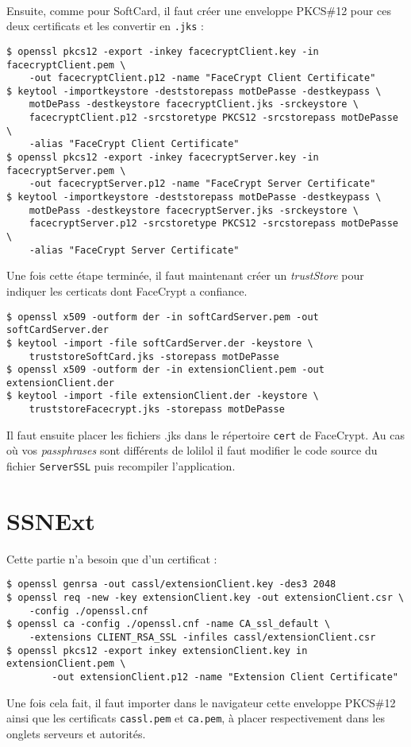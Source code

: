 \documentclass[a4paper,10pt]{article}
\begin{document}
\paragraph{}
Ensuite, comme pour SoftCard, il faut créer une enveloppe PKCS\#12 pour ces
deux certificats et les convertir en \texttt{.jks} : 
\begin{verbatim}
$ openssl pkcs12 -export -inkey facecryptClient.key -in facecryptClient.pem \ 
    -out facecryptClient.p12 -name "FaceCrypt Client Certificate"
$ keytool -importkeystore -deststorepass motDePasse -destkeypass \ 
    motDePass -destkeystore facecryptClient.jks -srckeystore \ 
    facecryptClient.p12 -srcstoretype PKCS12 -srcstorepass motDePasse \ 
    -alias "FaceCrypt Client Certificate"
$ openssl pkcs12 -export -inkey facecryptServer.key -in facecryptServer.pem \ 
    -out facecryptServer.p12 -name "FaceCrypt Server Certificate"
$ keytool -importkeystore -deststorepass motDePasse -destkeypass \ 
    motDePass -destkeystore facecryptServer.jks -srckeystore \ 
    facecryptServer.p12 -srcstoretype PKCS12 -srcstorepass motDePasse \ 
    -alias "FaceCrypt Server Certificate"
\end{verbatim}
Une fois cette étape terminée, il faut maintenant créer un \emph{trustStore}
pour indiquer les certicats dont FaceCrypt a confiance.
\begin{verbatim}
$ openssl x509 -outform der -in softCardServer.pem -out softCardServer.der
$ keytool -import -file softCardServer.der -keystore \ 
    truststoreSoftCard.jks -storepass motDePasse
$ openssl x509 -outform der -in extensionClient.pem -out extensionClient.der
$ keytool -import -file extensionClient.der -keystore \ 
    truststoreFacecrypt.jks -storepass motDePasse
\end{verbatim}

Il faut ensuite placer les fichiers .jks dans le répertoire \texttt{cert}
de FaceCrypt. Au cas où vos \emph{passphrases} sont différents de 
\og lolilol \fg{} il faut modifier le code source du fichier 
\texttt{ServerSSL} puis recompiler l'application.

\section{SSNExt}
Cette partie n'a besoin que d'un certificat : 
\begin{verbatim}
$ openssl genrsa -out cassl/extensionClient.key -des3 2048
$ openssl req -new -key extensionClient.key -out extensionClient.csr \
    -config ./openssl.cnf
$ openssl ca -config ./openssl.cnf -name CA_ssl_default \ 
    -extensions CLIENT_RSA_SSL -infiles cassl/extensionClient.csr
$ openssl pkcs12 -export inkey extensionClient.key in extensionClient.pem \
        -out extensionClient.p12 -name "Extension Client Certificate"
\end{verbatim}
Une fois cela fait, il faut importer dans le navigateur cette enveloppe 
PKCS\#12 ainsi que les certificats \texttt{cassl.pem} et \texttt{ca.pem}, 
à placer respectivement dans les onglets serveurs et autorités.
\end{document}
